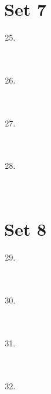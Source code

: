 \documentclass[11pt]{article}
\begin{document}
\eject

\section*{Set 7}

\begin{multicols*}{1} \begin{enumerate} 
\setcounter{enumi}{24}

\item \underline{\phantom{000000000000000}} \\ \\ \\
\item \underline{\phantom{000000000000000}} \\ \\ \\
\item \underline{\phantom{000000000000000}} \\ \\ \\
\item \underline{\phantom{000000000000000}} \\ \\ \\

\end{enumerate} \end{multicols*}

\eject

\section*{Set 8}

\begin{multicols*}{1} \begin{enumerate} 
\setcounter{enumi}{28}

\item \underline{\phantom{000000000000000}} \\ \\ \\
\item \underline{\phantom{000000000000000}} \\ \\ \\
\item \underline{\phantom{000000000000000}} \\ \\ \\
\item \underline{\phantom{000000000000000}} \\ \\ \\

\end{enumerate} \end{multicols*}

\eject
\end{document}
